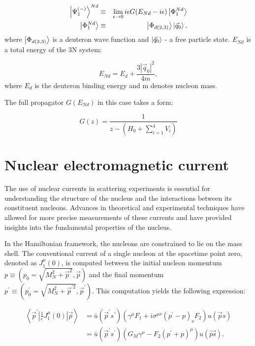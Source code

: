     \begin{eqnarray}
        \ket{\Psi^{(-)}_1}^{Nd} &\equiv& \lim_{\epsilon \rightarrow 0} 
        i \epsilon G(E_{Nd} - i\epsilon)\ket{\Phi^{Nd}_1}\\
        \ket{\Phi^{Nd}_1} &\equiv& \ket{\Phi_{d(2,3)}}\ket{\vec{q}_0},
    \end{eqnarray}
    where $\ket{\Phi_{d(2,3)}}$ is a deuteron wave function and 
    $\ket{\vec{q}_0}$ - a free particle state. $E_{Nd}$
    is a total energy of the 3N system:

    \begin{equation}
        E_{Nd} = E_d + \frac{3 |\vec{q}_0|^2}{4m},
    \end{equation}
    where $E_d$ is the deuteron binding energy and m denotes nucleon mass. 

    The full propagator $G(E_{Nd})$ in this case takes a form:
    
    \begin{equation}
        G(z)= \frac{1}{z - (H_0 + \sum_{i=1}^4V_i)}
    \end{equation}


    \section{Nuclear electromagnetic current}
    \label{sec_current}
    
    The use of nuclear currents in scattering experiments is essential for understanding the structure of the nucleus and
    the interactions between its constituent nucleons. Advances in theoretical and experimental techniques have allowed
    for more precise measurements of these currents and have provided insights into
    the fundamental properties of the nucleus.

    In the Hamiltonian framework, the nucleons are constrained to lie on the mass shell. The conventional current of a
    single nucleon at the spacetime point zero, denoted as $J_1^\mu(0)$, is computed between the initial nucleon momentum
    $p \equiv\left(p_0=\sqrt{M_N^2+\vec{p}^2}, \vec{p}\right)$
    and the final momentum
    $p^{\prime} \equiv\left(p_0^{\prime}=\sqrt{M_N^2+\vec{p}^{\prime 2}}, \vec{p}^{\prime}\right)$. This computation yields the following expression:

    \begin{equation}
        \begin{aligned}
        \left\langle\vec{p}^{\prime}\left|\frac{1}{e} J_1^\mu(0)\right| \vec{p}\right\rangle & =\bar{u}\left(\vec{p}^{\prime} s^{\prime}\right)\left(\gamma^\mu F_1+i \sigma^{\mu \nu}\left(p^{\prime}-p\right)_\nu F_2\right) u(\vec{p} s) \\
        & =\bar{u}\left(\vec{p}^{\prime} s^{\prime}\right)\left(G_M \gamma^\mu-F_2\left(p^{\prime}+p\right)^\mu\right) u(\overrightarrow{p s}) .
        \end{aligned}
        \label{current_general}       
    \end{equation}
    
